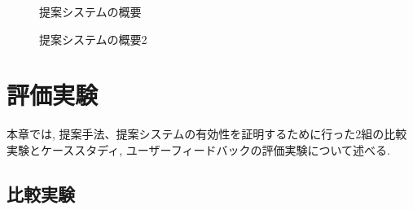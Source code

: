 \documentclass[syuuron]{kuee}
\begin{document}
		\begin{figure}
			\begin{center}
			\end{center}
			\caption{提案システムの概要}
	  		\label{fig:sys1}
		\end{figure}
		\begin{figure}
			\begin{center}
			\end{center}
			\caption{提案システムの概要2}
	  		\label{fig:sys2}
		\end{figure}

\chapter{評価実験}
	本章では, 提案手法、提案システムの有効性を証明するために行った2組の比較実験とケーススタディ, ユーザーフィードバックの評価実験について述べる. 
	\section{比較実験}
\end{document}
